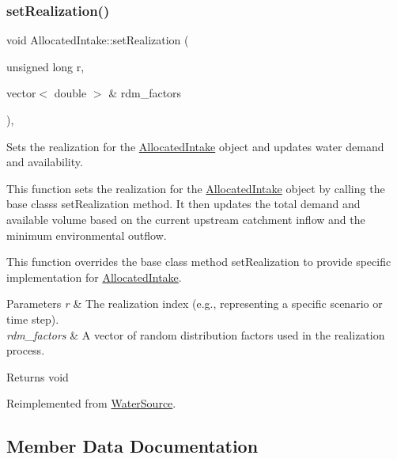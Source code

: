 \subsubsection{\texorpdfstring{set\+Realization()}{setRealization()}}
{\footnotesize\ttfamily void Allocated\+Intake\+::set\+Realization (\begin{DoxyParamCaption}\item[{unsigned long}]{r,  }\item[{vector$<$ double $>$ \&}]{rdm\+\_\+factors }\end{DoxyParamCaption})\hspace{0.3cm}{\ttfamily [override]}, {\ttfamily [virtual]}}



Sets the realization for the {\ttfamily \mbox{\hyperlink{classAllocatedIntake}{Allocated\+Intake}}} object and updates water demand and availability. 

This function sets the realization for the {\ttfamily \mbox{\hyperlink{classAllocatedIntake}{Allocated\+Intake}}} object by calling the base class\textquotesingle{}s {\ttfamily set\+Realization} method. It then updates the total demand and available volume based on the current upstream catchment inflow and the minimum environmental outflow.

This function overrides the base class method {\ttfamily set\+Realization} to provide specific implementation for {\ttfamily \mbox{\hyperlink{classAllocatedIntake}{Allocated\+Intake}}}.


\begin{DoxyParams}{Parameters}
{\em r} & The realization index (e.\+g., representing a specific scenario or time step). \\
\hline
{\em rdm\+\_\+factors} & A vector of random distribution factors used in the realization process.\\
\hline
\end{DoxyParams}
\begin{DoxyReturn}{Returns}
void 
\end{DoxyReturn}


Reimplemented from \mbox{\hyperlink{classWaterSource_a634904c510b16de6d7c057fed6d6e625}{Water\+Source}}.



\subsection{Member Data Documentation}
\mbox{\label{classAllocatedIntake_aab00f81a712fe2ecff1f69d0bb53d92a}} 
